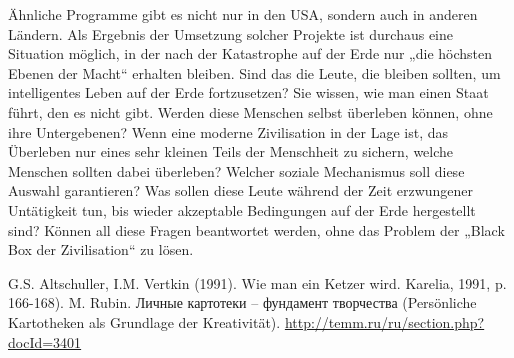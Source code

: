 \documentclass[11pt,a4paper]{article}
\begin{document}
Ähnliche Programme gibt es nicht nur in den USA, sondern auch in anderen
Ländern. Als Ergebnis der Umsetzung solcher Projekte ist durchaus eine
Situation möglich, in der nach der Katastrophe auf der Erde nur „die höchsten
Ebenen der Macht“ erhalten bleiben. Sind das die Leute, die bleiben sollten,
um intelligentes Leben auf der Erde fortzusetzen?  Sie wissen, wie man einen
Staat führt, den es nicht gibt. Werden diese Menschen selbst überleben können,
ohne ihre Untergebenen?  Wenn eine moderne Zivilisation in der Lage ist, das
Überleben nur eines sehr kleinen Teils der Menschheit zu sichern, welche
Menschen sollten dabei überleben?  Welcher soziale Mechanismus soll diese
Auswahl garantieren? Was sollen diese Leute während der Zeit erzwungener
Untätigkeit tun, bis wieder akzeptable Bedingungen auf der Erde hergestellt
sind?  Können all diese Fragen beantwortet werden, ohne das Problem der „Black
Box der Zivilisation“ zu lösen.

\begin{thebibliography}{xxx}
 G.S. Altschuller, I.M. Vertkin (1991). Wie man ein
  Ketzer wird.  Karelia, 1991, p.  166-168).
 M. Rubin. \foreignlanguage{russian}{Личные картотеки –
  фундамент творчества} (Persönliche Kartotheken als Grundlage der
  Kreativität). \url{http://temm.ru/ru/section.php?docId=3401}
\end{thebibliography}
\end{document}
